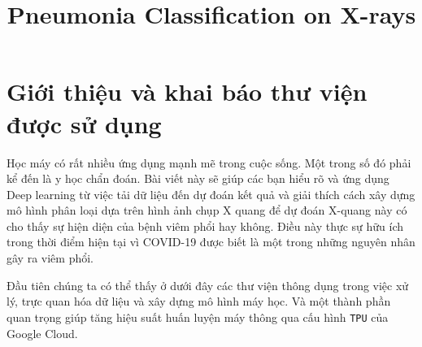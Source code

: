 \documentclass[11pt]{article}
\title{Pneumonia Classification on X-rays}
\begin{document}
    
    \maketitle
    
    

    
    \section{Giới thiệu và khai báo thư viện được sử dụng}\label{introduction-set-up}

Học máy có rất nhiều ứng dụng mạnh mẽ trong cuộc sống. Một trong số đó phải kể đến là
y học chẩn đoán. Bài viết này sẽ giúp các bạn hiểu rõ và ứng dụng Deep learning từ việc tải dữ liệu đến dự đoán kết quả và giải thích cách xây dựng mô hình phân loại dựa trên hình ảnh chụp X quang để dự đoán X-quang này có cho thấy sự hiện diện của bệnh viêm phổi hay không. Điều này thực sự hữu ích trong thời điểm hiện tại vì COVID-19 được biết là một trong những nguyên nhân gây ra viêm phổi.

Đầu tiên chúng ta có thể thấy ở dưới đây các thư viện thông dụng trong việc xử lý, trực
quan hóa dữ liệu và xây dựng mô hình máy học. Và một thành phần quan trọng giúp tăng hiệu suất huấn luyện máy thông qua cấu hình \texttt{TPU} của Google Cloud.
\end{document}
